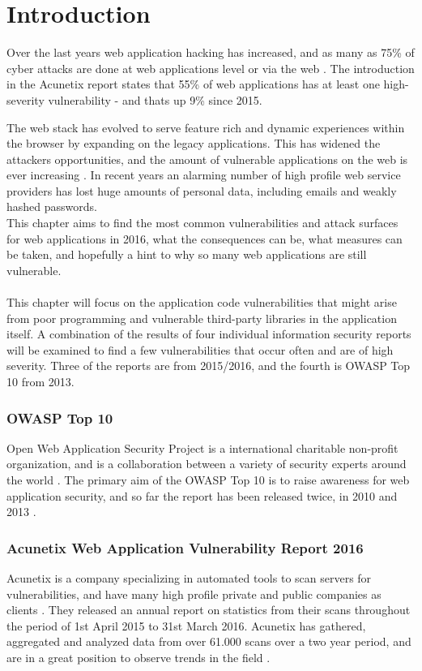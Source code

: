 \section{Introduction}
Over the last years web application hacking has increased, and as many as 75\% of cyber attacks are done at web applications level or via the web \cite{AcunetixCompany}. The introduction in the Acunetix report states that 55\% of web applications has at least one high-severity vulnerability - and thats up 9\% since 2015.

The web stack has evolved to serve feature rich and dynamic experiences within the browser by expanding on the legacy applications. This has widened the attackers opportunities, and the amount of vulnerable applications on the web is ever increasing \cite{Acunetix2016}. In recent years an alarming number of high profile web service providers has lost huge amounts of personal data, including emails and weakly hashed passwords. \\ This chapter aims to find the most common vulnerabilities and attack surfaces for web applications in 2016, what the consequences can be, what measures can be taken, and hopefully a hint to why so many web applications are still vulnerable.
\\ \\
This chapter will focus on the application code vulnerabilities that might arise from poor programming and vulnerable third-party libraries in the application itself. A combination of the results of four individual information security reports will be examined to find a few vulnerabilities that occur often and are of high severity. Three of the reports are from 2015/2016, and the fourth is OWASP Top 10 from 2013. 
\subsubsection{OWASP Top 10}
Open Web Application Security Project is a international charitable non-profit organization, and is a collaboration between a variety of security experts around the world \cite{OwaspCompany}. The primary aim of the OWASP Top 10 is to raise awareness for web application security, and so far the report has been released twice, in 2010 and 2013 \cite{OwaspTop10Project}.
\subsubsection{Acunetix Web Application Vulnerability Report 2016}
Acunetix is a company specializing in automated tools to scan servers for vulnerabilities, and have many high profile private and public companies as clients \cite{AcunetixCompany}. They released an annual report on statistics from their scans throughout the period of 1st April 2015 to 31st March 2016. Acunetix has gathered, aggregated and analyzed data from over 61.000 scans over a two year period, and are in a great position to observe trends in the field \cite{Acunetix2016}. 
